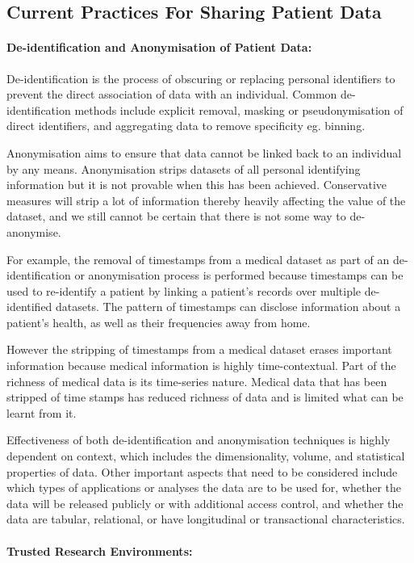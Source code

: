 \documentclass[11pt]{article}
\begin{document}
\subsection{Current Practices For Sharing Patient Data}

\paragraph{De-identification and Anonymisation of Patient Data:}
De-identification is the process of obscuring or replacing personal identifiers to prevent the direct association of data with an individual. Common de-identification methods include explicit removal,  masking or pseudonymisation of direct identifiers, and  aggregating data to remove specificity eg. binning.  

Anonymisation aims to ensure that data cannot be linked back to an individual by any means. Anonymisation strips datasets of all personal identifying information but it is not provable when this has been achieved. Conservative measures will strip a lot of information thereby heavily affecting the value of the dataset, and we still cannot be certain that there is not some way to de-anonymise. 

For example, the removal of timestamps from a medical dataset as part of an de-identification or anonymisation process is performed because timestamps can be used to re-identify a patient by linking a patient's records over multiple de-identified datasets. The pattern of timestamps can disclose information about a patient's health, as well as their frequencies away from home.

However the stripping of timestamps from a medical dataset erases important information because medical information is highly time-contextual. Part of the richness of medical data is its time-series nature. Medical data that has been stripped of time stamps has reduced richness of data and is limited what can be learnt from it. 

Effectiveness of both de-identification and anonymisation techniques is highly dependent on context, which includes the dimensionality, volume, and statistical properties of data. Other important aspects that need to be considered include which types of applications or analyses the data are to be used for, whether the data will be released publicly or with additional access control, and whether the data are tabular, relational, or have longitudinal or transactional characteristics.

\paragraph{Trusted Research Environments:}
\end{document}

